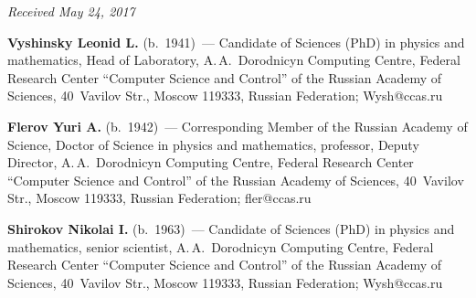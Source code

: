\vspace*{-6pt}

\hfill{\small\textit{Received May 24, 2017}}


\Contr

\noindent
\textbf{Vyshinsky Leonid L.} (b.\ 1941)~--- Candidate of Sciences (PhD) in physics and 
mathematics, Head of Laboratory, A.\,A.~Dorodnicyn Computing 
Centre, Federal Research Center ``Computer Science and Control'' of the Russian 
Academy of Sciences, 40~Vavilov Str., Moscow 119333, Russian Federation; 
\mbox{Wysh@ccas.ru} 

\vspace*{3pt}

\noindent
\textbf{Flerov Yuri A.} (b.\ 1942)~--- Corresponding Member of the Russian 
Academy of Science, Doctor of Science in physics and mathematics, professor, 
Deputy Director, A.\,A.~Dorodnicyn Computing Centre, Federal Research Center 
``Computer Science and Control'' of the Russian Academy of Sciences, 40~Vavilov 
Str., Moscow 119333, Russian Federation; \mbox{fler@ccas.ru}

\vspace*{3pt}

\noindent
\textbf{Shirokov Nikolai I.} (b.\ 1963)~--- Candidate of Sciences (PhD) in physics and 
mathematics, senior scientist, A.\,A.~Dorodnicyn Computing Centre, Federal 
Research Center ``Computer Science and Control'' of the Russian Academy of 
Sciences, 40~Vavilov Str., Moscow 119333, Russian Federation; 
\mbox{Wysh@ccas.ru} 



\label{end\stat}


\renewcommand{\bibname}{\protect\rm Литература} 